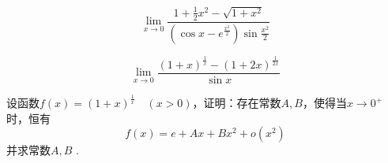 \begin{question}
    \begin{equation}
        \nonumber
        \lim\limits_{x \to 0} \frac{ 1 + \frac{1}{2} x^2 - \sqrt{ 1 + x^2 } }{ ( \cos x - e^{ \frac{x^2}{2} }) \sin \frac{x^2}{2} }
    \end{equation}
\end{question}

\begin{question}
    \begin{equation*}
        \lim\limits_{x \to 0} \frac{ ( 1 + x )^{ \frac{1}{x} } -( 1 + 2x )^{ \frac{1}{2x} } }{ \sin x }
    \end{equation*}
\end{question}

\begin{question}
    设函数$ f(x) = (1 + x)^{\frac{1}{x}} \quad (x > 0) $，证明：存在常数$ A, B $，使得当$ x \to 0^+ $时，恒有
    \begin{equation*}
        f(x) = e + Ax +Bx^2 + o(x^2)
    \end{equation*}   
    并求常数$ A, B $ .
\end{question}
